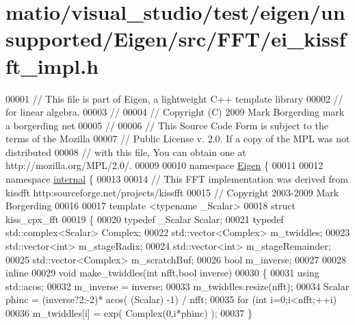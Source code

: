 \hypertarget{matio_2visual__studio_2test_2eigen_2unsupported_2_eigen_2src_2_f_f_t_2ei__kissfft__impl_8h_source}{}\section{matio/visual\+\_\+studio/test/eigen/unsupported/\+Eigen/src/\+F\+F\+T/ei\+\_\+kissfft\+\_\+impl.h}
\label{matio_2visual__studio_2test_2eigen_2unsupported_2_eigen_2src_2_f_f_t_2ei__kissfft__impl_8h_source}

\begin{DoxyCode}
00001 \textcolor{comment}{// This file is part of Eigen, a lightweight C++ template library}
00002 \textcolor{comment}{// for linear algebra.}
00003 \textcolor{comment}{//}
00004 \textcolor{comment}{// Copyright (C) 2009 Mark Borgerding mark a borgerding net}
00005 \textcolor{comment}{//}
00006 \textcolor{comment}{// This Source Code Form is subject to the terms of the Mozilla}
00007 \textcolor{comment}{// Public License v. 2.0. If a copy of the MPL was not distributed}
00008 \textcolor{comment}{// with this file, You can obtain one at http://mozilla.org/MPL/2.0/.}
00009 
00010 \textcolor{keyword}{namespace }\hyperlink{namespace_eigen}{Eigen} \{ 
00011 
00012 \textcolor{keyword}{namespace }\hyperlink{namespaceinternal}{internal} \{
00013 
00014   \textcolor{comment}{// This FFT implementation was derived from kissfft http:sourceforge.net/projects/kissfft}
00015   \textcolor{comment}{// Copyright 2003-2009 Mark Borgerding}
00016 
00017 \textcolor{keyword}{template} <\textcolor{keyword}{typename} \_Scalar>
00018 \textcolor{keyword}{struct }kiss\_cpx\_fft
00019 \{
00020   \textcolor{keyword}{typedef} \_Scalar Scalar;
00021   \textcolor{keyword}{typedef} std::complex<Scalar> Complex;
00022   std::vector<Complex> m\_twiddles;
00023   std::vector<int> m\_stageRadix;
00024   std::vector<int> m\_stageRemainder;
00025   std::vector<Complex> m\_scratchBuf;
00026   \textcolor{keywordtype}{bool} m\_inverse;
00027 
00028   \textcolor{keyword}{inline}
00029     \textcolor{keywordtype}{void} make\_twiddles(\textcolor{keywordtype}{int} nfft,\textcolor{keywordtype}{bool} inverse)
00030     \{
00031       \textcolor{keyword}{using} std::acos;
00032       m\_inverse = inverse;
00033       m\_twiddles.resize(nfft);
00034       Scalar phinc =  (inverse?2:-2)* acos( (Scalar) -1)  / nfft;
00035       \textcolor{keywordflow}{for} (\textcolor{keywordtype}{int} i=0;i<nfft;++i)
00036         m\_twiddles[i] = exp( Complex(0,i*phinc) );
00037     \}

\end{DoxyCode}
